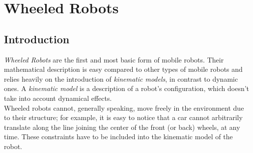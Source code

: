 \chapter{Wheeled Robots}
\section{Introduction}
\textit{Wheeled Robots} are the first and most basic form of mobile robots. Their mathematical description is easy compared to other types of mobile robots and relies heavily on the introduction of \textit{kinematic models}, in contrast to dynamic ones. A \textit{kinematic model} is a description of a robot's configuration, which doesn't take into account dynamical effects. \\
Wheeled robots cannot, generally speaking, move freely in the environment due to their structure; for example, it is easy to notice that a car cannot arbitrarily translate along the line joining the center of the front (or back) wheels, at any time. These constraints have to be included into the kinematic model of the robot.
